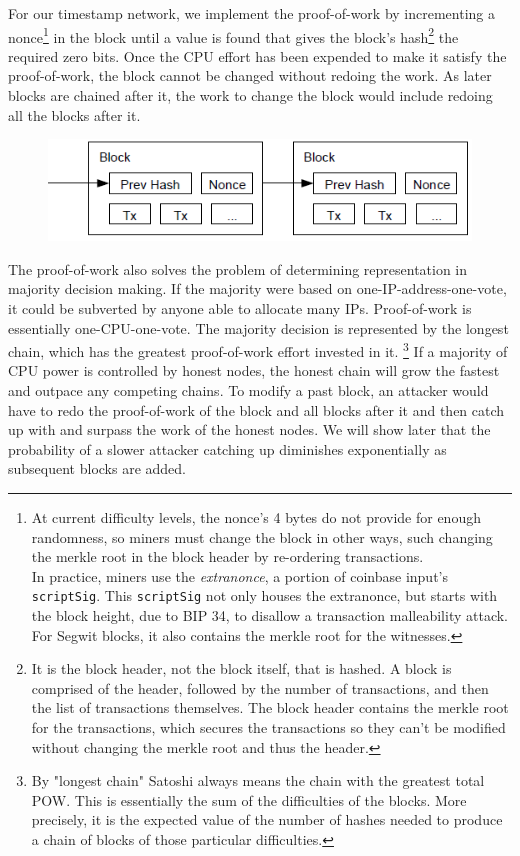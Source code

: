 \documentclass[nohyper]{tufte-handout}
\begin{document}
For our timestamp network, we implement the proof-of-work by
incrementing a nonce\footnote[][-1in]{At current difficulty levels, the nonce's 4 bytes do not provide for enough randomness, so miners must change the block in other ways, such changing the merkle root in the block header by re-ordering transactions.\\In practice, miners use the \emph{extranonce}, a portion of coinbase input's \texttt{scriptSig}.  This \texttt{scriptSig} not only houses the extranonce, but starts with the block height, due to BIP 34, to disallow a transaction malleability attack.  For Segwit blocks, it also contains the merkle root for the witnesses.} in the block until a value is found that gives the
block's hash\footnote[][0.1in]{It is the block header, not the block itself, that is hashed.  A block is comprised of the header, followed by the number of transactions, and then the list of transactions themselves.  The block header contains the merkle root for the transactions, which secures the transactions so they can't be modified without changing the merkle root and thus the header.} the required zero bits. Once the CPU effort has been
expended to make it satisfy the proof-of-work, the block cannot be
changed without redoing the work. As later blocks are chained after it,
the work to change the block would include redoing all the blocks after
it.

\begin{figure}[!h]
\centering
\includegraphics[width=0.75\linewidth]{proof-of-work.png}
\end{figure}

The proof-of-work also solves the problem of determining representation
in majority decision making. If the majority were based on
one-IP-address-one-vote, it could be subverted by anyone able to
allocate many IPs. Proof-of-work is essentially one-CPU-one-vote. The
majority decision is represented by the longest chain, which has the greatest proof-of-work effort invested in it.  \footnote{By "longest chain" Satoshi always means the chain with the greatest total POW.  This is essentially the sum of the difficulties of the blocks.  More precisely, it is the expected value of the number of hashes needed to produce a chain of blocks of those particular difficulties.} If a majority of CPU power is controlled by honest nodes, the honest chain will grow the fastest and outpace any competing chains. To modify a past block, an attacker would have to redo the proof-of-work of the block and all blocks after
it and then catch up with and surpass the work of the honest nodes. We will show later that the probability of a slower attacker catching up
diminishes exponentially as subsequent blocks are added.
\end{document}
